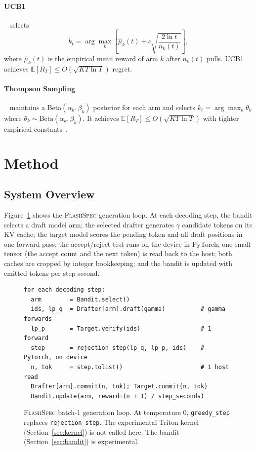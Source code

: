 \documentclass[11pt]{article}
\newcommand{\flashspec}{\textsc{FlashSpec}}
\newcommand{\E}{\mathbb{E}}
\begin{document}
\paragraph{UCB1}~\citep{auer2002finite} selects
\begin{equation}
  k_t = \arg\max_k \left[\hat{\mu}_k(t) + c\sqrt{\frac{2\ln t}{n_k(t)}}\right],
\end{equation}
where $\hat{\mu}_k(t)$ is the empirical mean reward of arm $k$ after $n_k(t)$
pulls.
UCB1 achieves $\E[R_T] \leq O(\sqrt{KT\ln T})$ regret.

\paragraph{Thompson Sampling}~\citep{thompson1933} maintains a
Beta$(\alpha_k, \beta_k)$ posterior for each arm and selects
$k_t = \arg\max_k \theta_k$ where $\theta_k \sim \mathrm{Beta}(\alpha_k,\beta_k)$.
It achieves $\E[R_T] \leq O(\sqrt{KT\ln T})$ with tighter empirical
constants~\citep{chapelle2011thompson}.

\section{Method}
\label{sec:method}

\subsection{System Overview}

Figure~\ref{fig:pipeline} shows the \flashspec{} generation loop.
At each decoding step, the bandit selects a draft model arm; the selected
drafter generates $\gamma$ candidate tokens on its KV cache; the target
model scores the pending token and all draft positions in one forward pass;
the accept/reject test runs on the device in PyTorch; one small tensor
(the accept count and the next token) is read back to the host; both
caches are cropped by integer bookkeeping; and the bandit is updated with
emitted tokens per step second.

\begin{figure}[t]
\centering
\begin{verbatim}
for each decoding step:
  arm        = Bandit.select()
  ids, lp_q  = Drafter[arm].draft(gamma)          # gamma forwards
  lp_p       = Target.verify(ids)                 # 1 forward
  step       = rejection_step(lp_q, lp_p, ids)    # PyTorch, on device
  n, tok     = step.tolist()                      # 1 host read
  Drafter[arm].commit(n, tok); Target.commit(n, tok)
  Bandit.update(arm, reward=(n + 1) / step_seconds)
\end{verbatim}
\caption{%
  \flashspec{} batch-1 generation loop.
  At temperature 0, \texttt{greedy\_step} replaces
  \texttt{rejection\_step}.
  The experimental Triton kernel (Section~\ref{sec:kernel}) is not
  called here.
  The bandit (Section~\ref{sec:bandit}) is experimental.
}
\label{fig:pipeline}
\end{figure}
\end{document}
